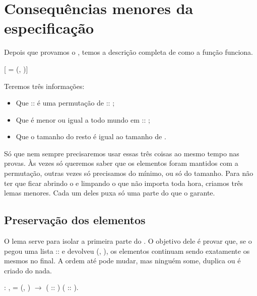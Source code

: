 \section{Consequências menores da especificação}




    Depois que provamos o , temos a descrição completa de como a função  funciona.


[   = (, )]


    Teremos três informações:

\begin{itemize}
\item  Que  ::  é uma permutação de  :: ;

\item  Que  é menor ou igual a todo mundo em  :: ;

\item  Que o tamanho do resto  é igual ao tamanho de .

\end{itemize}


    Só que nem sempre precisaremos usar essas três coisas ao mesmo tempo nas provas. Às vezes só queremos saber que os elementos foram mantidos com a permutação, outras vezes só precisamos do mínimo, ou só do tamanho.
    Para não ter que ficar abrindo o  e limpando o que não importa toda hora, criamos três lemas menores. Cada um deles puxa só uma parte do que o  garante. 

\subsection{Preservação dos elementos}




    O lema  serve para isolar a primeira parte do .
    O objetivo dele é provar que, se o  pegou uma lista  ::  e devolveu (, ), os elementos continuam sendo exatamente os mesmos no final. A ordem até pode mudar, mas ninguém some, duplica ou é criado do nada.
\begin{coqdoccode}
\coqdocemptyline
\coqdocnoindent
{}  :\coqdoceol
\coqdocindent{1.00em}
\coqdockw{\ensuremath{\forall}}    ,\coqdoceol
\coqdocindent{2.00em}
   = (, ) \ensuremath{\rightarrow}\coqdoceol
\coqdocindent{2.00em}
 ( :: ) ( :: ).\coqdoceol
\coqdocemptyline
\end{coqdoccode}
